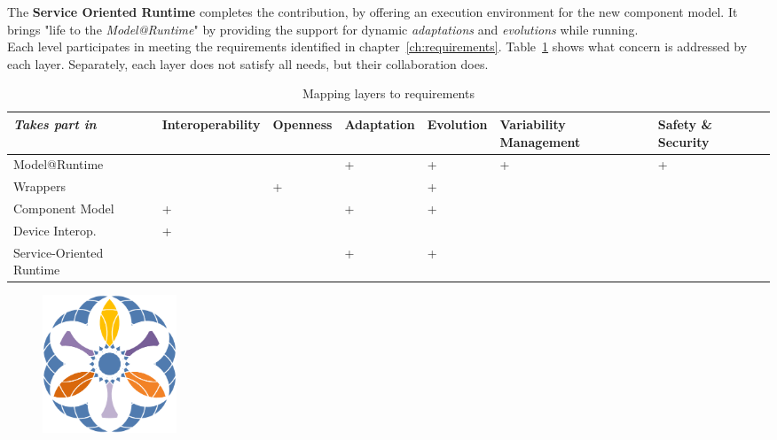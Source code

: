 The {\bf Service Oriented Runtime} completes the contribution, by offering an execution environment for the new component model. It brings "life to the {\it Model@Runtime}" by providing the support for dynamic {\it adaptations} and {\it evolutions} while running.\\

Each level participates in meeting the requirements identified in chapter~\ref{ch:requirements}. Table~\ref{table:layer_req} shows what concern is addressed by each layer. Separately, each layer does not satisfy all needs, but their collaboration does.\\

\begin{table}[h!]
\begin{tabular}{m{}| >{\centering\arraybackslash}m{}| >{\centering\arraybackslash}m{}| >{\centering\arraybackslash}m{}| >{\centering\arraybackslash}m{}| >{\centering}m{}| >{\centering\arraybackslash}m{}|}
 {\it Takes part in}& {\tiny Interoperability} & {\tiny Openness} & {\tiny Adaptation} & {\tiny Evolution} & {\tiny Variability Management} & {\tiny Safety \& Security}\\
 \hline\hline
 {\small Model@Runtime} & & & + & + & + & + \\
  \hline
 {\small Wrappers} & & + &  & + &  & \\
  \hline
 {\small Component Model} & + & & + & + & & \\
  \hline
 {\small Device Interop.} & + & & & & & \\
  \hline
 {\small Service-Oriented Runtime} & & & + & + & &\\
 \hline
\end{tabular}
 \caption{Mapping layers to requirements}
 \label{table:layer_req}
\end{table}

\begin{figure}
  \vspace{-4mm}
  \includegraphics[width=40mm]{part2/pics/entimidLogo.png}
\end{figure}

